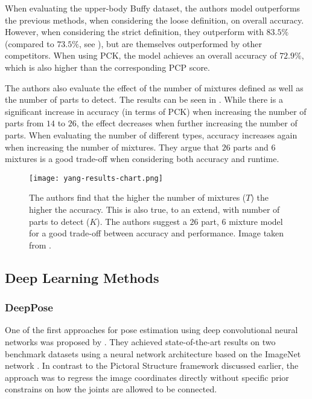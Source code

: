 When evaluating the upper-body Buffy dataset, the authors model outperforms the previous methods, when considering the loose definition, on overall accuracy.
However, when considering the strict definition, they outperform \cite{andriluka_pictorial_2009} with $83.5\%$ (compared to $73.5\%$, see ), but are themselves outperformed by other competitors.
When using PCK, the model achieves an overall accuracy of $72.9\%$, which is also higher than the corresponding PCP score.

The authors also evaluate the effect of the number of mixtures defined as well as the number of parts to detect.
The results can be seen in .
While there is a significant increase in accuracy (in terms of PCK) when increasing the number of parts from $14$ to $26$, the effect decreases when further increasing the number of parts.
When evaluating the number of different types, accuracy increases again when increasing the number of mixtures.
They argue that $26$ parts and $6$ mixtures is a good trade-off when considering both accuracy and runtime.  

\begin{figure}[htb!]
    \centering
    \texttt{[image: yang-results-chart.png]}
    \caption{The authors find that the higher the number of mixtures ($T$) the higher the accuracy. This is also true, to an extend, with number of parts to detect ($K$). The authors suggest a $26$ part, $6$ mixture model for a good trade-off between accuracy and performance. Image taken from \cite{yang_articulated_2011}.}
    \label{fig:yang-results-chart}
\end{figure}

\subsection{Deep Learning Methods}

\subsubsection{DeepPose}
\label{sec:deeppose}

One of the first approaches for pose estimation using deep convolutional neural networks was proposed by \cite{toshev_deeppose:_2014}.
They achieved state-of-the-art results on two benchmark datasets using a neural network architecture based on the ImageNet network \cite{krizhevsky_imagenet_2012}.
In contrast to the Pictoral Structure framework discussed earlier, the approach was to regress the image coordinates directly without specific prior constrains on how the joints are allowed to be connected.


